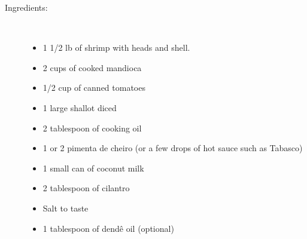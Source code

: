 \documentclass[11pt,letterpaper]{article}
\begin{document}
\begin{description}

\item[Ingredients:]\ \\
	\begin{itemize}
	\item 1 1/2 lb of shrimp with heads and shell.
	\item 2 cups of cooked mandioca
	\item 1/2 cup of canned tomatoes
	\item 1 large shallot diced
	\item 2 tablespoon of cooking oil
	\item 1 or 2 pimenta de cheiro (or a few drops of hot sauce such as Tabasco)
	\item 1 small can of coconut milk
	\item 2 tablespoon of cilantro
	\item Salt to taste
	\item 1 tablespoon of dend\^e oil (optional)
	\end{itemize}


\end{description}
\end{document}
